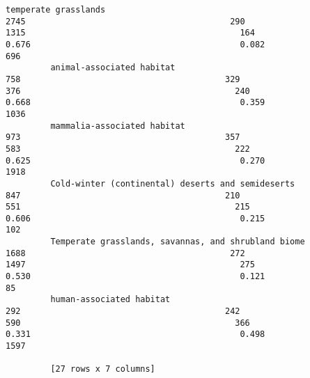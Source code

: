 \documentclass{article}
\begin{document}
\begin{Verbatim}[commandchars=\\\{\}]
         temperate grasslands                                                                              2745                                         290                                               1315                                           164                                    0.676                                          0.082                696
         animal-associated habitat                                                                          758                                         329                                                376                                           240                                    0.668                                          0.359               1036
         mammalia-associated habitat                                                                        973                                         357                                                583                                           222                                    0.625                                          0.270               1918
         Cold-winter (continental) deserts and semideserts                                                  847                                         210                                                551                                           215                                    0.606                                          0.215                102
         Temperate grasslands, savannas, and shrubland biome                                               1688                                         272                                               1497                                           275                                    0.530                                          0.121                 85
         human-associated habitat                                                                           292                                         242                                                590                                           366                                    0.331                                          0.498               1597
         
         [27 rows x 7 columns]
\end{Verbatim}
        

    
    
    
    
\end{document}
